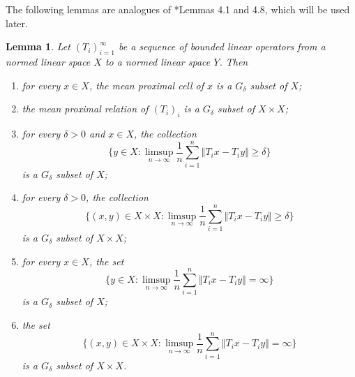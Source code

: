 \documentclass[12pt,a4paper]{amsart}
\theoremstyle{definition}
\theoremstyle{plain}
\newtheorem{lem}[defn]{Lemma}
\begin{document}
The following lemmas are analogues of \cite{JL2022}*{Lemmas 4.1 and 4.8}, which will be used later.
\begin{lem}\label{mean proximal}
    Let $(T_i)_{i=1}^{\infty}$ be a sequence of bounded linear operators from a normed linear space $X$ to a normed linear space $Y$. Then
    \begin{enumerate}
        \item \label{Lem: MProx cell G-delta}
              for every $x\in X$, the mean proximal cell of $x$ is a $G_{\delta}$ subset of $X$;
        \item \label{Lem: MProx G-delta}
             the mean proximal relation of $(T_i)_i$ is a $G_{\delta}$ subset of $X\times X$;
        \item \label{Lem: cell-delta}
              for every $\delta>0$ and $x\in X$, the collection
              \[
                  \biggl\{ y\in X: \limsup_{n\to \infty} \frac{1}{n} \sum_{i=1}^n \Vert T_ix- T_iy \Vert \ge \delta \biggr\}
              \]
              is a $G_{\delta}$ subset of $X$;
        \item \label{Lem: delta}
              for every $\delta>0$, the collection
              \[
                  \biggl\{ (x,y)\in X\times X: \limsup_{n\to \infty} \frac{1}{n} \sum_{i=1}^n \Vert T_ix-T_iy \Vert \ge \delta \biggr\}
              \]
              is a $G_{\delta}$ subset of $X\times X$;
        \item \label{Lem: cell-infty}
              for every $x\in X$, the set
              \[
                  \biggl\{ y\in X: \limsup_{n\to \infty} \frac{1}{n} \sum_{i=1}^n \Vert T_ix-T_iy \Vert =\infty \biggl \}
              \]
              is a $G_{\delta}$ subset of $X$;
        \item \label{Lem: infty}
              the set
              \[
                  \biggl\{ (x, y)\in X\times X: \limsup_{n\to \infty} \frac{1}{n} \sum_{i=1}^n \Vert T_ix-T_iy \Vert =\infty \biggl \}
              \]
              is a $G_{\delta}$ subset of $X\times X$.
    \end{enumerate}
\end{lem}
\end{document}
